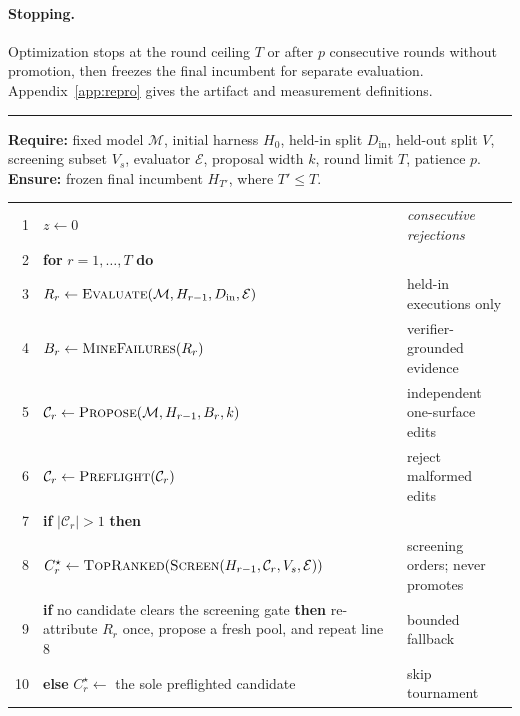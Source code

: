 \paragraph{Stopping.}
Optimization stops at the round ceiling $T$ or after $p$ consecutive rounds
without promotion, then freezes the final incumbent for separate evaluation.
Appendix~\ref{app:repro} gives the artifact and measurement definitions.

\begin{algorithm*}[t]
\caption{Executed SH-RLM optimization and promotion procedure}
\label{alg:self-harness}
\small
\hrule\vspace{2pt}
\textbf{Require:} fixed model $\mathcal{M}$, initial harness $H_0$, held-in
split $D_{\mathrm{in}}$, held-out split $V$, screening subset $V_s$, evaluator
$\mathcal{E}$, proposal width $k$, round limit $T$, patience $p$.\\[-1pt]
\textbf{Ensure:} frozen final incumbent $H_{T'}$, where $T'\leq T$.\\[-2pt]
\begin{tabular}{@{}r@{\hspace{5pt}}p{}@{\hspace{8pt}}p{}@{}}
1 & $z\leftarrow0$ & \emph{consecutive rejections}\\
2 & \textbf{for} $r=1,\ldots,T$ \textbf{do} & \\
3 & \quad $R_r\leftarrow\textsc{Evaluate}(\mathcal{M},H_{r-1},D_{\mathrm{in}},\mathcal{E})$ & held-in executions only\\
4 & \quad $B_r\leftarrow\textsc{MineFailures}(R_r)$ & verifier-grounded evidence\\
5 & \quad $\mathcal{C}_r\leftarrow\textsc{Propose}(\mathcal{M},H_{r-1},B_r,k)$ & independent one-surface edits\\
6 & \quad $\mathcal{C}_r\leftarrow\textsc{Preflight}(\mathcal{C}_r)$ & reject malformed edits\\
7 & \quad \textbf{if} $|\mathcal{C}_r|>1$ \textbf{then} & \\
8 & \qquad $C_r^\star\leftarrow\textsc{TopRanked}(\textsc{Screen}(H_{r-1},\mathcal{C}_r,V_s,\mathcal{E}))$ & screening orders; never promotes\\
9 & \qquad \textbf{if} no candidate clears the screening gate \textbf{then} re-attribute $R_r$ once, propose a fresh pool, and repeat line 8 & bounded fallback\\
10 & \quad \textbf{else} $C_r^\star\leftarrow$ the sole preflighted candidate & skip tournament\\

\end{tabular}
\end{algorithm*}
